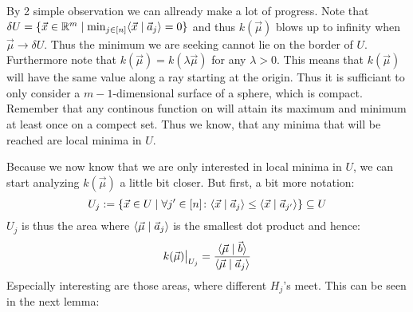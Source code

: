 By 2 simple observation we can allready make a lot of progress. Note that $\delta U = \{\vec x \in \mathbb{R}^m \mid \min_{j \in [n]}\langle \vec x \mid \vec a_j \rangle = 0\}$ and thus $k(\vec \mu)$ blows up to infinity when $\vec \mu \to \delta U$. Thus the minimum we are seeking cannot lie on the border of $U$. Furthermore note that $k(\vec \mu) = k(\lambda \vec\mu)$ for any $\lambda > 0$. This means that $k(\vec \mu)$ will have the same value along a ray starting at the origin. Thus it is sufficiant to only consider a $m-1$-dimensional surface of a sphere, which is compact. Remember that any continous function on will attain its maximum and minimum at least once on a compect set. Thus we know, that any minima that will be reached are local minima in $U$.

Because we now know that we are only interested in local minima in $U$, we can start analyzing $k(\vec \mu)$ a little bit closer. But first, a bit more notation:
$$U_j := \{\vec x \in U \mid \forall j' \in [n]\colon \langle \vec x \mid \vec a_j \rangle \leq \langle \vec x \mid \vec a_{j'} \rangle\} \subseteq U$$
$U_j$ is thus the area where $\langle \vec\mu \mid \vec a_j \rangle$ is the smallest dot product and hence:
$$\restrict{k(\vec\mu)}{U_j} = \frac{\sprod{\vec\mu}{\vec b}}{\sprod{\vec\mu}{\vec a_j}}$$
Especially interesting are those areas, where different $H_j$'s meet. This can be seen in the next lemma:

